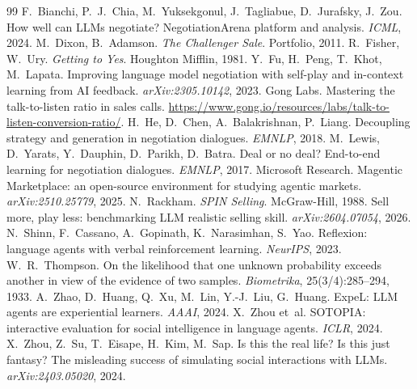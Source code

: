 \documentclass[11pt,a4paper]{article}
\begin{document}
\begin{thebibliography}{99}\small
{} F.~Bianchi, P.~J.~Chia, M.~Yuksekgonul, J.~Tagliabue, D.~Jurafsky, J.~Zou. How well can LLMs negotiate? NegotiationArena platform and analysis. \emph{ICML}, 2024.
 M.~Dixon, B.~Adamson. \emph{The Challenger Sale}. Portfolio, 2011.
 R.~Fisher, W.~Ury. \emph{Getting to Yes}. Houghton Mifflin, 1981.
 Y.~Fu, H.~Peng, T.~Khot, M.~Lapata. Improving language model negotiation with self-play and in-context learning from AI feedback. \emph{arXiv:2305.10142}, 2023.
 Gong Labs. Mastering the talk-to-listen ratio in sales calls. \url{https://www.gong.io/resources/labs/talk-to-listen-conversion-ratio/}.
 H.~He, D.~Chen, A.~Balakrishnan, P.~Liang. Decoupling strategy and generation in negotiation dialogues. \emph{EMNLP}, 2018.
 M.~Lewis, D.~Yarats, Y.~Dauphin, D.~Parikh, D.~Batra. Deal or no deal? End-to-end learning for negotiation dialogues. \emph{EMNLP}, 2017.
 Microsoft Research. Magentic Marketplace: an open-source environment for studying agentic markets. \emph{arXiv:2510.25779}, 2025.
 N.~Rackham. \emph{SPIN Selling}. McGraw-Hill, 1988.
 Sell more, play less: benchmarking LLM realistic selling skill. \emph{arXiv:2604.07054}, 2026.
 N.~Shinn, F.~Cassano, A.~Gopinath, K.~Narasimhan, S.~Yao. Reflexion: language agents with verbal reinforcement learning. \emph{NeurIPS}, 2023.
 W.~R.~Thompson. On the likelihood that one unknown probability exceeds another in view of the evidence of two samples. \emph{Biometrika}, 25(3/4):285--294, 1933.
 A.~Zhao, D.~Huang, Q.~Xu, M.~Lin, Y.-J.~Liu, G.~Huang. ExpeL: LLM agents are experiential learners. \emph{AAAI}, 2024.
 X.~Zhou et~al. SOTOPIA: interactive evaluation for social intelligence in language agents. \emph{ICLR}, 2024.
 X.~Zhou, Z.~Su, T.~Eisape, H.~Kim, M.~Sap. Is this the real life? Is this just fantasy? The misleading success of simulating social interactions with LLMs. \emph{arXiv:2403.05020}, 2024.
\end{thebibliography}
\end{document}
